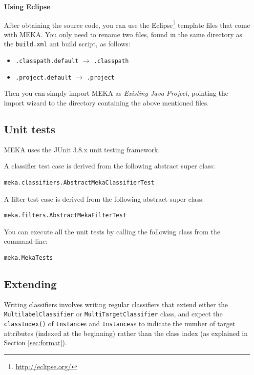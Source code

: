 \documentclass[11pt]{article}
\newcommand{\MEKA}{Meka}
\newcommand{\WEKA}{Weka}
\newcommand{\heading}[1]{
    \vspace{0.3cm} \noindent \textbf{#1} \newline
}
\begin{document}
\heading{Using Eclipse}
After obtaining the source code, you can use the Eclipse\footnote{\url{http://eclipse.org/}} template files that come with MEKA. You only need to rename two files, found in the same directory as the \texttt{build.xml} ant build script, as follows:
\begin{itemize}
  \item \texttt{.classpath.default} $\rightarrow$ \texttt{.classpath}
  \item \texttt{.project.default} $\rightarrow$ \texttt{.project}
\end{itemize}
Then you can simply import MEKA as \textit{Existing Java Project}, pointing the import wizard to the directory containing the above mentioned files.

\subsection{Unit tests}
\label{unittests}
MEKA uses the JUnit 3.8.x unit testing framework.

\noindent A classifier test case is derived from the following abstract super class:
\begin{lstlisting}
meka.classifiers.AbstractMekaClassifierTest
\end{lstlisting}

\noindent A filter test case is derived from the following abstract super class:
\begin{lstlisting}
meka.filters.AbstractMekaFilterTest
\end{lstlisting}

\noindent You can execute all the unit tests by calling the following class from the command-line:
\begin{lstlisting}
meka.MekaTests
\end{lstlisting}

\subsection{\label{sec:extending}Extending \framework{\MEKA}}%

Writing \framework{\MEKA} classifiers involves writing regular \framework{\WEKA} classifiers that extend either the \texttt{MultilabelClassifier} or \texttt{MultiTargetClassifier} class, and expect the \texttt{classIndex()} of \texttt{Instance}s and \texttt{Instances}s to indicate the number of target attributes (indexed at the beginning) rather than the class index (as explained in Section \ref{sec:format}). 
\end{document}
